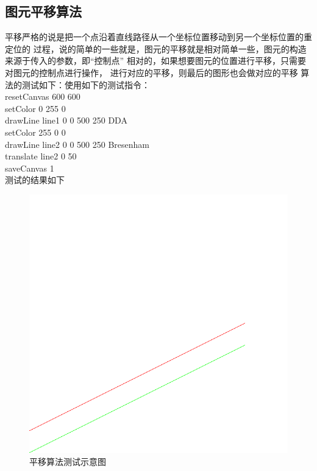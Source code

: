 \documentclass[a4paper,UTF8]{article}
\theoremstyle{definition}
\begin{document}
\subsection{图元平移算法}
平移严格的说是把一个点沿着直线路径从一个坐标位置移动到另一个坐标位置的重定位的
过程，说的简单的一些就是，图元的平移就是相对简单一些，图元的构造来源于传入的参数，即“控制点”
相对的，如果想要图元的位置进行平移，只需要对图元的控制点进行操作，
进行对应的平移，则最后的图形也会做对应的平移
算法的测试如下：使用如下的测试指令：\\

resetCanvas 600 600\\

setColor 0 255 0\\

drawLine line1 0 0 500 250 DDA\\

setColor 255 0 0\\

drawLine line2 0 0 500 250 Bresenham\\

translate line2 0 50\\

saveCanvas 1\\

测试的结果如下
\begin{figure}[h]
	\centering
	\includegraphics[scale=0.4]{figure/1.png}
	\caption{平移算法测试示意图}
	\label{fig:Rotate}
\end{figure}
\end{document}
